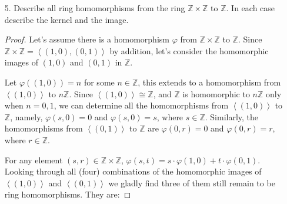 \documentclass[10pt]{article}
\newcommand{\Z}{\mathbb{Z}}
\begin{document}
\begin{itemize}
\begin{proof}
 \begin{tabular}{lll}
    Homomorphism & Kernel & Image in $\Z/30\Z$\\
		\hline
    $\varphi(m) = \overline{0}$ & $\Z$ & $\left\langle \overline{30}\right\rangle = \left\langle \overline{0}\right\rangle$\\  
    $\varphi(m) = \overline{m}$ & $30\Z$ & $\left\langle \overline{1} \right\rangle = \Z/30\Z$\\
    $\varphi(m) = \overline{6m}$ & $5\Z$ & $\left\langle \overline{6} \right\rangle$\\
    $\varphi(m) = \overline{10m}$ & $3\Z$ & $\left\langle \overline{10} \right\rangle$\\
    $\varphi(m) = \overline{15m}$ & $2\Z$ & $\left\langle \overline{15} \right\rangle$\\
    $\varphi(m) = \overline{16m}$ & $15\Z$ & $\left\langle \overline{16} \right\rangle = \left\langle \overline{2} \right\rangle$\\
    $\varphi(m) = \overline{21m}$ & $10\Z$ & $\left\langle \overline{21} \right\rangle = \left\langle \overline{3} \right\rangle$\\
    $\varphi(m) =\overline{25m}$ & $6\Z$ & $\left\langle \overline{25} \right\rangle = \left\langle \overline{5} \right\rangle$\\
   \end{tabular}
\end{proof}

\item[5.] Describe all ring homomorphisms from the ring $\Z \times \Z$ to $\Z$. In each case describe the kernel and the image. 

\begin{proof} Let's assume there is a homomorphism $\varphi$ from $\Z \times \Z$ to $\Z$.  Since $\Z \times \Z = \left\langle (1,0),(0,1) \right\rangle$ by addition, let's consider the homomorphic images of $(1,0)$ and $(0,1)$ in $\Z$. 

Let $\varphi((1,0)) = n$ for some $n \in \Z$, this extends to a homomorphism from $\left\langle(1,0)\right\rangle$ to $n\Z$. Since $\left\langle(1,0)\right\rangle \cong \Z$, and $\Z$ is homomorphic to $n\Z$ only when $n = 0,1$, we can determine all the homomorphisms from $\left\langle(1,0)\right\rangle$ to $\Z$, namely, $\varphi(s,0)=0$ and $\varphi(s,0)=s$, where $s \in \Z$.  Similarly, the homomorphisms from $\left\langle(0,1)\right\rangle$ to $\Z$ are $\varphi(0,r)=0$ and $\varphi(0,r)=r$, where $r \in \Z$.

For any element $(s, r) \in \Z \times \Z$, $\varphi(s, t) = s \cdot \varphi(1, 0) + t \cdot \varphi(0, 1)$.  Looking through all (four) combinations of the homomorphic images of $\left\langle(1,0)\right\rangle$ and $\left\langle(0,1)\right\rangle$ we gladly find three of them still remain to be ring homomorphisms. They are:


\end{proof}
\end{itemize}
\end{document}
